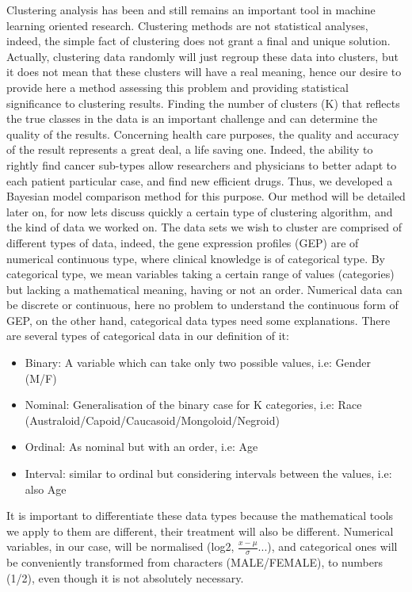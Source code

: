 \documentclass[twocolumn,12pt]{article}
\begin{document}
Clustering analysis has been and still remains an important tool in machine learning oriented research. Clustering methods are not statistical analyses, indeed, the simple fact of clustering
does not grant a final and unique solution. Actually, clustering data randomly will just regroup these data into clusters, but it does not mean that these clusters will have a real meaning, hence our desire to provide here a method assessing this problem and providing statistical significance to clustering results.
Finding the number of clusters (K) that reflects the true classes in the data is an important challenge and can determine the quality of the results. 
Concerning health care purposes, the quality and accuracy of the result represents a great deal, a life saving one.
Indeed, the ability to rightly find cancer sub-types allow researchers and physicians to better adapt to each patient particular case, and find new efficient drugs.
Thus, we developed a Bayesian model comparison method for this purpose.
Our method will be detailed later on, for now lets discuss quickly a certain type of clustering algorithm, and the kind of data we worked on.
The data sets we wish to cluster are comprised of different types of data, indeed, the gene expression profiles (GEP) are of numerical continuous type, where clinical knowledge is of categorical type. By categorical type, we mean variables taking a certain range of values (categories) but lacking a mathematical meaning, having or not an order.
Numerical data can be discrete or continuous, here no problem to understand the continuous form of GEP, on the other hand, categorical data types need some explanations.
There are several types of categorical data in our definition of it:
\begin{itemize}
    \item Binary: A variable which can take only two possible values, i.e: Gender (M/F)
    \item Nominal: Generalisation of the binary case for K categories, i.e: Race (Australoid/Capoid/Caucasoid/Mongoloid/Negroid)
    \item Ordinal: As nominal but with an order, i.e: Age
    \item Interval: similar to ordinal but considering intervals between the values, i.e: also Age
\end{itemize}
It is important to differentiate these data types because the mathematical tools we apply to them are different, their treatment will also be different.
Numerical variables, in our case, will be normalised (log2, $\frac{x-\mu}{\sigma}$...), and categorical ones will be conveniently transformed from characters (MALE/FEMALE), to numbers (1/2), even though it is not absolutely necessary.
\end{document}
